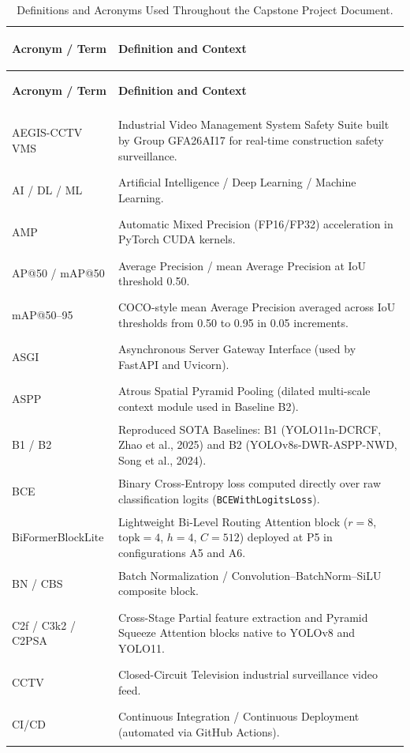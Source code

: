 \begin{longtable}{|>{\bfseries\raggedright\arraybackslash}p{3.8cm}|p{10.5cm}|}
\caption{Definitions and Acronyms Used Throughout the Capstone Project Document.}
\label{tab:acronyms} \\
\hline
\rowcolor{slatehdr}
\textbf{Acronym / Term} & \textbf{Definition and Context} \\
\hline
\endfirsthead
\hline
\rowcolor{slatehdr}
\textbf{Acronym / Term} & \textbf{Definition and Context} \\
\hline
\endhead
\hline
\endfoot
AEGIS-CCTV VMS & Industrial Video Management System Safety Suite built by Group GFA26AI17 for real-time construction safety surveillance. \\ \hline
AI / DL / ML & Artificial Intelligence / Deep Learning / Machine Learning. \\ \hline
AMP & Automatic Mixed Precision (FP16/FP32) acceleration in PyTorch CUDA kernels. \\ \hline
AP@50 / mAP@50 & Average Precision / mean Average Precision at IoU threshold 0.50. \\ \hline
mAP@50--95 & COCO-style mean Average Precision averaged across IoU thresholds from 0.50 to 0.95 in 0.05 increments. \\ \hline
ASGI & Asynchronous Server Gateway Interface (used by FastAPI and Uvicorn). \\ \hline
ASPP & Atrous Spatial Pyramid Pooling (dilated multi-scale context module used in Baseline B2). \\ \hline
B1 / B2 & Reproduced SOTA Baselines: B1 (YOLO11n-DCRCF, Zhao et al., 2025) and B2 (YOLOv8s-DWR-ASPP-NWD, Song et al., 2024). \\ \hline
BCE & Binary Cross-Entropy loss computed directly over raw classification logits (\texttt{BCEWithLogitsLoss}). \\ \hline
BiFormerBlockLite & Lightweight Bi-Level Routing Attention block ($r=8$, $\text{topk}=4$, $h=4$, $C=512$) deployed at P5 in configurations A5 and A6. \\ \hline
BN / CBS & Batch Normalization / Convolution--BatchNorm--SiLU composite block. \\ \hline
C2f / C3k2 / C2PSA & Cross-Stage Partial feature extraction and Pyramid Squeeze Attention blocks native to YOLOv8 and YOLO11. \\ \hline
CCTV & Closed-Circuit Television industrial surveillance video feed. \\ \hline
CI/CD & Continuous Integration / Continuous Deployment (automated via GitHub Actions). \\ \hline

\end{longtable}
